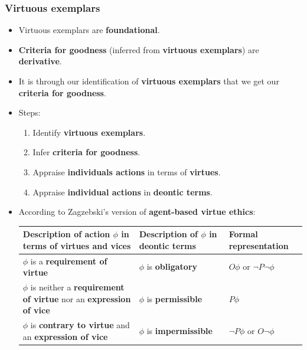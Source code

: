 \documentclass[11pt]{article}
\begin{document}
\subsubsection{Virtuous exemplars}
\label{sec:orga9c7db5}
\begin{itemize}
\item Virtuous exemplars are \textbf{foundational}.
\item \textbf{Criteria for goodness} (inferred from \textbf{virtuous exemplars}) are \textbf{derivative}.
\item It is through our identification of \textbf{virtuous exemplars} that we get our \textbf{criteria for goodness}.
\item Steps:
\begin{enumerate}
\item Identify \textbf{virtuous exemplars}.
\item Infer \textbf{criteria for goodness}.
\item Appraise \textbf{individuals actions} in terms of \textbf{virtues}.
\item Appraise \textbf{individual actions} in \textbf{deontic terms}.
\end{enumerate}
\item According to Zagzebski's version of \textbf{agent-based virtue ethics}:

\begin{center}
\begin{tabularx}{\textwidth}{|X|X|X|}
\hline
Description of action \(\phi\) in terms of virtues and vices & Description of \(\phi\) in deontic terms & Formal representation\\
\hline
\(\phi\) is a \textbf{requirement of virtue} & \(\phi\) is \textbf{obligatory} & \(O \phi\) or \(\neg P \neg \phi\)\\
\hline
\(\phi\) is neither a \textbf{requirement of virtue} nor an \textbf{expression of vice} & \(\phi\) is \textbf{permissible} & \(P \phi\)\\
\hline
\(\phi\) is \textbf{contrary to virtue} and an \textbf{expression of vice} & \(\phi\) is \textbf{impermissible} & \(\neg P \phi\) or \(O \neg \phi\)\\
\hline
\end{tabularx}
\end{center}
\end{itemize}

 \newpage
\end{document}
